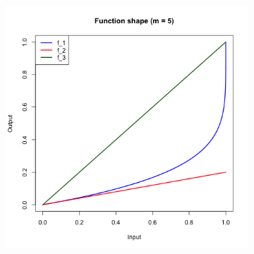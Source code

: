 \documentclass[a4paper, 11pt]{article}
\begin{document}
\begin{figure}[H]
\begin{subfigure}{.5\textwidth}
  \includegraphics[width=1\linewidth]{pic3.png}
\end{subfigure}
\end{figure}
\end{document}
